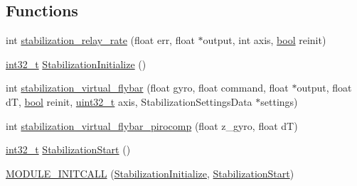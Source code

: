 \subsection*{Functions}
\begin{DoxyCompactItemize}
\item 
int \hyperlink{group___stabilization_module_gae98f3dcccca3bf2f6978a8f44529c14a}{stabilization\-\_\-relay\-\_\-rate} (float err, float $\ast$output, int axis, \hyperlink{group___exported__types_gaf6a258d8f3ee5206d682d799316314b1}{bool} reinit)
\item 
\hyperlink{group___n_a_m_e_gafd12020da5a235dfcf0c3c748fb5baed}{int32\-\_\-t} \hyperlink{group___stabilization_module_ga0271ad4d56816c408814d99db9d15b8b}{Stabilization\-Initialize} ()
\item 
int \hyperlink{group___stabilization_module_ga59f8ecdbf84bddb7072618a7de6e817e}{stabilization\-\_\-virtual\-\_\-flybar} (float gyro, float command, float $\ast$output, float d\-T, \hyperlink{group___exported__types_gaf6a258d8f3ee5206d682d799316314b1}{bool} reinit, \hyperlink{stdint_8h_a435d1572bf3f880d55459d9805097f62}{uint32\-\_\-t} axis, Stabilization\-Settings\-Data $\ast$settings)
\item 
int \hyperlink{group___stabilization_module_ga286dd4b805297b12acd0aa9a69780a75}{stabilization\-\_\-virtual\-\_\-flybar\-\_\-pirocomp} (float z\-\_\-gyro, float d\-T)
\item 
\hyperlink{group___n_a_m_e_gafd12020da5a235dfcf0c3c748fb5baed}{int32\-\_\-t} \hyperlink{group___stabilization_module_ga6190a7e200476bf20da7b47ac4107973}{Stabilization\-Start} ()
\item 
\hyperlink{group___stabilization_module_ga2ed12a01187d2c1f1659b1e9ee957d93}{M\-O\-D\-U\-L\-E\-\_\-\-I\-N\-I\-T\-C\-A\-L\-L} (\hyperlink{group___stabilization_module_ga0271ad4d56816c408814d99db9d15b8b}{Stabilization\-Initialize}, \hyperlink{group___stabilization_module_ga6190a7e200476bf20da7b47ac4107973}{Stabilization\-Start})
\end{DoxyCompactItemize}
